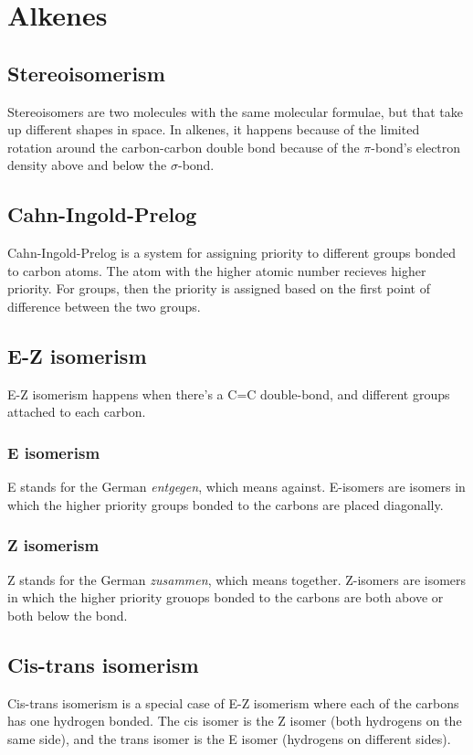 \section{Alkenes}
\subsection{Stereoisomerism}
Stereoisomers are two molecules with the same molecular formulae, but that take up different shapes in space. In alkenes, it happens because of the limited rotation around the carbon-carbon double bond because of the $\pi$-bond's electron density above and below the $\sigma$-bond.

\subsection{Cahn-Ingold-Prelog}
Cahn-Ingold-Prelog is a system for assigning priority to different groups bonded to carbon atoms. The atom with the higher atomic number recieves higher priority. For groups, then the priority is assigned based on the first point of difference between the two groups.

\subsection{E-Z isomerism}
E-Z isomerism happens when there's a C=C double-bond, and different groups attached to each carbon.
\subsubsection{E isomerism}
E stands for the German \textit{entgegen}, which means against. E-isomers are isomers in which the higher priority groups bonded to the carbons are placed diagonally.
\subsubsection{Z isomerism}
Z stands for the German \textit{zusammen}, which means together. Z-isomers are isomers in which the higher priority  grouops bonded to the carbons are both above or both below the bond.

\subsection{Cis-trans isomerism}
Cis-trans isomerism is a special case of E-Z isomerism where each of the carbons has one hydrogen bonded. The cis isomer is the Z isomer (both hydrogens on the same side), and the trans isomer is the E isomer (hydrogens on different sides).
